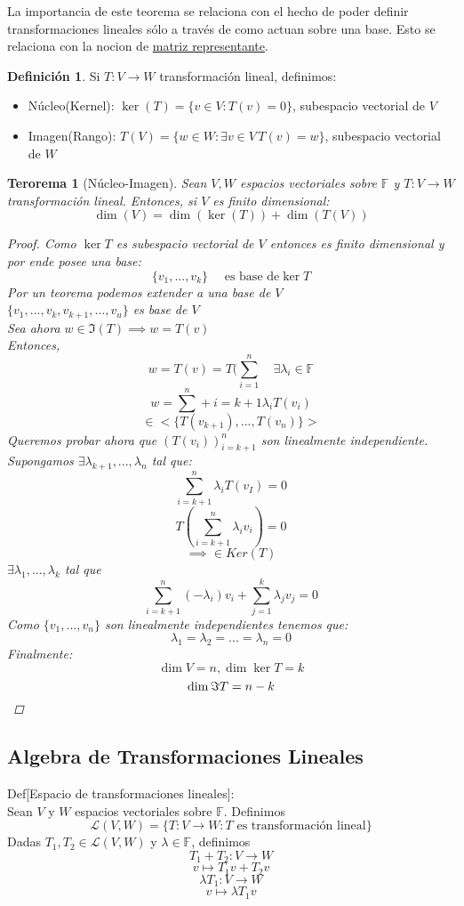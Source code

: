 \documentclass[11pt]{book}
\newtheorem{thm}{Terorema}[section]
\theoremstyle{definition}
\newtheorem{defn}{Definición}[section]
\begin{document}
La importancia de este teorema se relaciona con el hecho de poder definir transformaciones lineales sólo a través de como actuan sobre una base. Esto se relaciona con la nocion de \underline{matriz representante}.\\
\begin{defn}
Si $T:V\rightarrow W$ transformación lineal, definimos:
\begin{itemize}
	\item Núcleo(Kernel): $\ker(T)=\{v\in V:T(v)=0\}$, subespacio vectorial de $V$
	
	\item Imagen(Rango): $T(V)=\{w\in W:\exists v\in V\, T(v)=w\}$, subespacio vectorial de $W$
\end{itemize}
\end{defn}
\begin{thm}[Núcleo-Imagen]
Sean $V,W$ espacios vectoriales sobre $\mathbb{F}$ y $T:V\rightarrow W$ transformación lineal. Entonces, si $V$ es finito dimensional:
\[
\dim(V)=\dim(\ker(T))+\dim(T(V))
\]
\begin{proof}
Como $\ker T$ es subespacio vectorial de $V$ entonces es finito dimensional y por ende posee una base:
\[
\{v_1,...,v_k\} \quad\textrm{ es base de} \ker T
\]
Por un teorema podemos extender a una base de $V$\\
$\{v_1,...,v_k,v_{k+1},...,v_u\}$ es base de $V$\\
Sea ahora $w\in\Im(T)\implies w=T(v)$\\
Entonces,
\[
w=T(v)=T(\sum^n_{i=1}\quad\exists\lambda_i\in\mathbb{F}
\]
\[
w=\sum^n+{i=k+1}\lambda_iT(v_i)
\]
\[
\in<\{T(v_{k+1}),...,T(v_n)\}>
\]
Queremos probar ahora que $(T(v_i))^n_{i=k+1}$ son linealmente independiente. Supongamos $\exists\lambda_{k+1},...,\lambda_{n}$ tal que:
\[
\sum^n_{i=k+1}\lambda_iT(v_I)=0
\]
\[
T(\sum^n_{i=k+1}\lambda_iv_i)=0
\]
\[
\implies \in Ker(T)
\]
$\exists \lambda_1,...,\lambda_k$ tal que
\[
\sum^n_{i=k+1}(-\lambda_i)v_i+\sum^k_{j=1}\lambda_jv_j=0
\]
Como $\{v_1,...,v_n\}$ son linealmente independientes tenemos que:
\[
\lambda_1=\lambda_2=...=\lambda_n=0
\]
Finalmente:
\[
\dim V=n,\dim \ker T=k
\]
\[
\dim\Im T=n-k\qedhere
\]
\end{proof}
\end{thm}
\subsection{Algebra de Transformaciones Lineales}
Def[Espacio de transformaciones lineales]:\\
Sean $V$ y $W$ espacios vectoriales sobre $\mathbb{F}$. Definimos
\[
\mathcal{L}(V,W)=\{T:V\rightarrow W:T\textrm{ es transformación lineal}\}
\]
Dadas $T_1,T_2\in\mathcal{L}(V,W)$ y $\lambda\in\mathbb{F}$, definimos
\[
T_1+T_2:V\rightarrow W
\]
\[
v\mapsto T_1v+T_2v
\]
\[
\lambda T_1:V\rightarrow W
\]
\[
v\mapsto \lambda T_1v
\]
\end{document}
